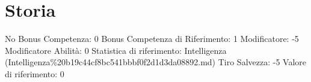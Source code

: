\section{Storia}\label{storia}

\begin{description}
\tightlist
\item[Tags: ABI]
No Bonus Competenza: 0 Bonus Competenza di Riferimento: 1 Modificatore:
-5 Modificatore Abilità: 0 Statistica di riferimento: Intelligenza
(Intelligenza\%20b19c44cf8bc541bbbf0f2d1d3da08892.md) Tiro Salvezza: -5
Valore di riferimento: 0
\end{description}
